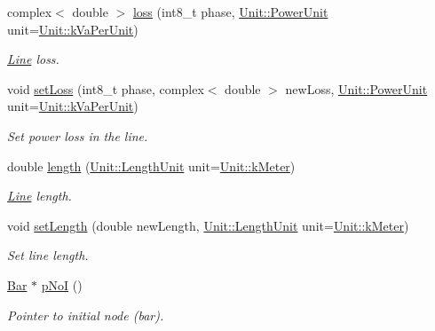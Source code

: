 \begin{DoxyCompactItemize}
complex$<$ double $>$ \hyperlink{group___models_ga511d4e89d613d4f222480476f2da3abe}{loss} (int8\+\_\+t phase, \hyperlink{class_unit_ace265ae255370ccacfd5370337572c3b}{Unit\+::\+Power\+Unit} unit=\hyperlink{class_unit_ace265ae255370ccacfd5370337572c3bae056e80d620a87c61a44c359e6b05cc1}{Unit\+::k\+Va\+Per\+Unit})
\begin{DoxyCompactList}\small\item\em \hyperlink{class_line}{Line} loss. \end{DoxyCompactList}\item 
void \hyperlink{group___models_gaf154792ce92a49027384b29de75373b9}{set\+Loss} (int8\+\_\+t phase, complex$<$ double $>$ new\+Loss, \hyperlink{class_unit_ace265ae255370ccacfd5370337572c3b}{Unit\+::\+Power\+Unit} unit=\hyperlink{class_unit_ace265ae255370ccacfd5370337572c3bae056e80d620a87c61a44c359e6b05cc1}{Unit\+::k\+Va\+Per\+Unit})
\begin{DoxyCompactList}\small\item\em Set power loss in the line. \end{DoxyCompactList}\item 
double \hyperlink{group___models_gae2e4500d0fa60dcc2ecb08b2c96954f9}{length} (\hyperlink{class_unit_a8c8921f7b225ad6063b1cb573425b9a0}{Unit\+::\+Length\+Unit} unit=\hyperlink{class_unit_a8c8921f7b225ad6063b1cb573425b9a0abfa41ebe7ee649a1f02c9b8ae570434b}{Unit\+::k\+Meter})
\begin{DoxyCompactList}\small\item\em \hyperlink{class_line}{Line} length. \end{DoxyCompactList}\item 
void \hyperlink{group___models_ga950d0b8f5d167eda430c65ca7adadbb0}{set\+Length} (double new\+Length, \hyperlink{class_unit_a8c8921f7b225ad6063b1cb573425b9a0}{Unit\+::\+Length\+Unit} unit=\hyperlink{class_unit_a8c8921f7b225ad6063b1cb573425b9a0abfa41ebe7ee649a1f02c9b8ae570434b}{Unit\+::k\+Meter})
\begin{DoxyCompactList}\small\item\em Set line length. \end{DoxyCompactList}\item 
\hyperlink{class_bar}{Bar} $\ast$ \hyperlink{group___models_gaeafd90e84ac2f8de2a879abe9e53eef3}{p\+No\+I} ()
\begin{DoxyCompactList}\small\item\em Pointer to initial node (bar). \end{DoxyCompactList}\item 

\end{DoxyCompactItemize}
